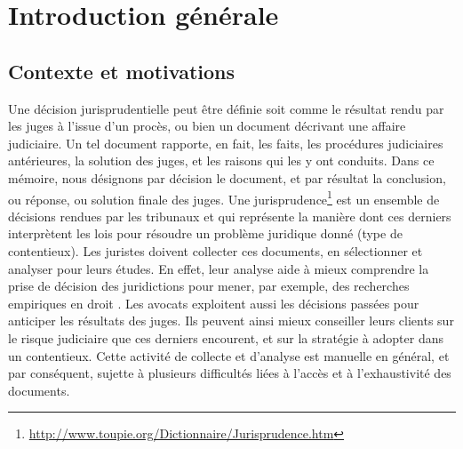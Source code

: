 \chapter*{Introduction générale}
\label{chap:intro}

\section{Contexte et motivations}
\label{sec:intro:contexte}
Une décision jurisprudentielle peut être définie soit comme  le résultat rendu par les juges à l'issue d'un procès, ou bien un document décrivant une affaire judiciaire. Un tel document rapporte, en fait,  les faits, les procédures judiciaires antérieures, la solution des juges, et les raisons qui les y ont conduits. Dans ce mémoire, nous désignons par \og décision \fg{} le document, et par  \og résultat\fg{} la conclusion, ou réponse, ou solution finale des juges. Une jurisprudence\footnote{\url{http://www.toupie.org/Dictionnaire/Jurisprudence.htm}} est un ensemble de décisions rendues par les tribunaux et qui représente la manière dont ces derniers interprètent les lois pour résoudre un problème juridique donné (type de contentieux). Les juristes doivent collecter ces documents, en sélectionner et analyser pour leurs études. En effet, leur analyse aide à mieux comprendre la prise de décision des juridictions pour mener, par exemple, des recherches empiriques en droit \citep{ancel2003expulsion, jeandidier2006pensions}. Les avocats exploitent aussi les décisions passées pour anticiper les résultats des juges. Ils peuvent ainsi mieux conseiller leurs clients sur le risque judiciaire que ces derniers encourent, et sur la stratégie à adopter dans un contentieux. Cette activité de collecte et d'analyse est manuelle en général, et par conséquent, sujette à plusieurs difficultés liées à l'accès et à l'exhaustivité des documents. 

